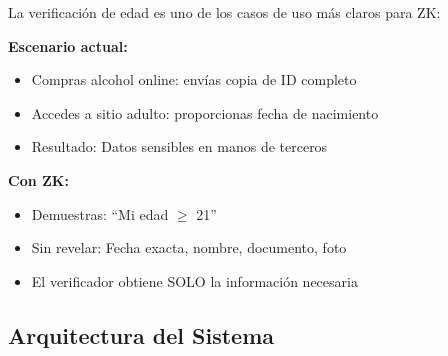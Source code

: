 \documentclass[11pt,a4paper,twoside]{book}
\theoremstyle{definition}
\theoremstyle{remark}
\begin{document}
\begin{intuicion}
La verificación de edad es uno de los casos de uso más claros para ZK:

\textbf{Escenario actual:}
\begin{itemize}
    \item Compras alcohol online: envías copia de ID completo
    \item Accedes a sitio adulto: proporcionas fecha de nacimiento
    \item Resultado: Datos sensibles en manos de terceros
\end{itemize}

\textbf{Con ZK:}
\begin{itemize}
    \item Demuestras: ``Mi edad $\geq$ 21''
    \item Sin revelar: Fecha exacta, nombre, documento, foto
    \item El verificador obtiene SOLO la información necesaria
\end{itemize}
\end{intuicion}

\subsection{Arquitectura del Sistema}
\end{document}
